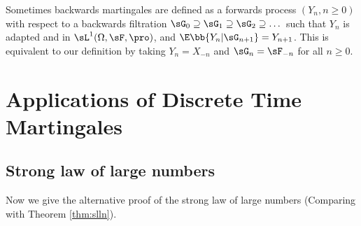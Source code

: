 \begin{remark}
Sometimes backwards martingales are defined as a forwards process $(Y_n, n \geq 0)$ with respect to a backwards filtration $\sG_0 \supseteq \sG_1 \supseteq \sG_2 \supseteq \dots$ such that $Y_n$ is adapted and in $\sL^1(\Omega,\sF,\pro)$, and $\E\bb{Y_n | \sG_{n+1}} = Y_{n+1}$. This is equivalent to our definition by taking $Y_n = X_{-n}$ and $\sG_n = \sF_{-n}$ for all $n \geq 0$.
\end{remark}


\section{Applications of Discrete Time Martingales}


\subsection{Strong law of large numbers}

Now we give the alternative proof of the strong law of large numbers (Comparing with Theorem \ref{thm:slln}).







